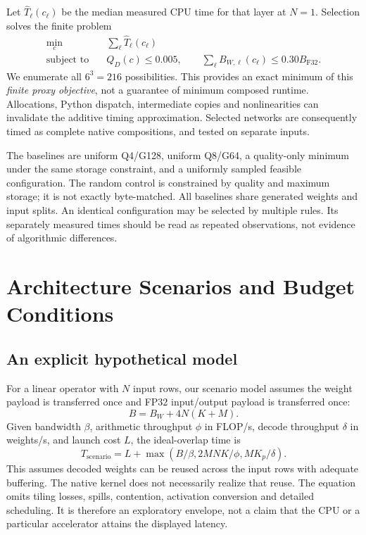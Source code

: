 \documentclass[11pt]{article}
\begin{document}
Let $\widehat T_\ell(c_\ell)$ be the median measured CPU time for that layer at
$N=1$. Selection solves the finite problem
\begin{align}
\min_c\quad &\sum_\ell\widehat T_\ell(c_\ell)\\
\text{subject to}\quad &Q_D(c)\leq 0.005,\qquad
\sum_\ell B_{W,\ell}(c_\ell)\leq 0.30 B_{\mathrm{F32}}.
\end{align}
We enumerate all $6^3=216$ possibilities. This provides an exact minimum of this
\emph{finite proxy objective}, not a guarantee of minimum composed runtime.
Allocations, Python dispatch, intermediate copies and nonlinearities can invalidate
the additive timing approximation. Selected networks are consequently timed as
complete native compositions, and tested on separate inputs.

The baselines are uniform Q4/G128, uniform Q8/G64, a quality-only minimum under the
same storage constraint, and a uniformly sampled feasible configuration. The random
control is constrained by quality and maximum storage; it is not exactly
byte-matched. All baselines share generated weights and input splits. An identical
configuration may be selected by multiple rules. Its separately measured times
should be read as repeated observations, not evidence of algorithmic differences.

\section{Architecture Scenarios and Budget Conditions}
\subsection{An explicit hypothetical model}
For a linear operator with $N$ input rows, our scenario model assumes the weight
payload is transferred once and FP32 input/output payload is transferred once:
\begin{equation}
B=B_W+4N(K+M).
\end{equation}
Given bandwidth $\beta$, arithmetic throughput $\phi$ in FLOP/s, decode throughput
$\delta$ in weights/s, and launch cost $L$, the ideal-overlap time is
\begin{equation}
T_{\mathrm{scenario}}=L+\max\left(B/\beta,
2MNK/\phi,MK_p/\delta\right).
\label{eq:time}
\end{equation}
This assumes decoded weights can be reused across the input rows with adequate
buffering. The native kernel does not necessarily realize that reuse. The equation
omits tiling losses, spills, contention, activation conversion and detailed
scheduling. It is therefore an exploratory envelope, not a claim that the CPU or a
particular accelerator attains the displayed latency.
\end{document}

